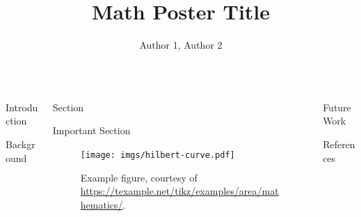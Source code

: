\documentclass{beamer}
\title{Math Poster Title}
\author{Author 1, Author 2}
\institute{Advised by Advisor}
\begin{document}
\begin{frame}[t]

    \begin{columns}[t]
    \separatorcolumn
    
    \begin{column}{\smallwidth}
        \begin{block}{Introduction}
            \lipsum[2]
        \end{block}
        \begin{block}{Background}
            \lipsum[1]
        \end{block}
    \end{column}

    \separatorcolumn

    \begin{column}{\largewidth}
        \begin{block}{Section}
            \lipsum[3]
        \end{block}
        \begin{framedblock}{Important Section}
            \lipsum[4]
            \begin{center}
                \begin{figure}
                    \texttt{[image: imgs/hilbert-curve.pdf]}
                    \caption{Example figure, courtesy of \url{https://texample.net/tikz/examples/area/mathematics/}.}
                \end{figure}
            \end{center}
            \lipsum[5]
        \end{framedblock}
    \end{column}

    \separatorcolumn

    \begin{column}{\smallwidth}
        \begin{block}{Future Work}
            \lipsum[6]
        \end{block}
        \begin{block}{References}
            \nocite{*}
            \printbibliography
        \end{block}
    \end{column}

    \separatorcolumn
    \end{columns}

\end{frame}
\end{document}
